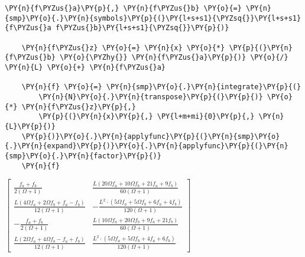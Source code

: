 \begin{tcolorbox}[breakable, size=fbox, boxrule=1pt, pad at break*=1mm,colback=cellbackground, colframe=cellborder]
    \begin{Verbatim}[commandchars=\\\{\}]
    \PY{n}{f\PYZus{}a}\PY{p}{,} \PY{n}{f\PYZus{}b} \PY{o}{=} \PY{n}{smp}\PY{o}{.}\PY{n}{symbols}\PY{p}{(}\PY{l+s+s1}{\PYZsq{}}\PY{l+s+s1}{f\PYZus{}a f\PYZus{}b}\PY{l+s+s1}{\PYZsq{}}\PY{p}{)}
    
    \PY{n}{f\PYZus{}z} \PY{o}{=} \PY{n}{x} \PY{o}{*} \PY{p}{(}\PY{n}{f\PYZus{}b} \PY{o}{\PYZhy{}} \PY{n}{f\PYZus{}a}\PY{p}{)} \PY{o}{/} \PY{n}{L} \PY{o}{+} \PY{n}{f\PYZus{}a}
    
    \PY{n}{f} \PY{o}{=} \PY{n}{smp}\PY{o}{.}\PY{n}{integrate}\PY{p}{(}
        \PY{n}{N}\PY{o}{.}\PY{n}{transpose}\PY{p}{(}\PY{p}{)} \PY{o}{*} \PY{n}{f\PYZus{}z}\PY{p}{,}
        \PY{p}{(}\PY{n}{x}\PY{p}{,} \PY{l+m+mi}{0}\PY{p}{,} \PY{n}{L}\PY{p}{)}
    \PY{p}{)}\PY{o}{.}\PY{n}{applyfunc}\PY{p}{(}\PY{n}{smp}\PY{o}{.}\PY{n}{expand}\PY{p}{)}\PY{o}{.}\PY{n}{applyfunc}\PY{p}{(}\PY{n}{smp}\PY{o}{.}\PY{n}{factor}\PY{p}{)}
    \PY{n}{f}
    \end{Verbatim}
\end{tcolorbox}
     
                
    
    $\displaystyle \left[\begin{matrix}\frac{f_{a} + f_{b}}{2 \left(\Omega + 1\right)} & \frac{L \left(20 \Omega f_{a} + 10 \Omega f_{b} + 21 f_{a} + 9 f_{b}\right)}{60 \left(\Omega + 1\right)}\\\frac{L \left(4 \Omega f_{a} + 2 \Omega f_{b} + f_{a} - f_{b}\right)}{12 \left(\Omega + 1\right)} & - \frac{L^{2} \cdot \left(5 \Omega f_{a} + 5 \Omega f_{b} + 6 f_{a} + 4 f_{b}\right)}{120 \left(\Omega + 1\right)}\\- \frac{f_{a} + f_{b}}{2 \left(\Omega + 1\right)} & \frac{L \left(10 \Omega f_{a} + 20 \Omega f_{b} + 9 f_{a} + 21 f_{b}\right)}{60 \left(\Omega + 1\right)}\\\frac{L \left(2 \Omega f_{a} + 4 \Omega f_{b} - f_{a} + f_{b}\right)}{12 \left(\Omega + 1\right)} & \frac{L^{2} \cdot \left(5 \Omega f_{a} + 5 \Omega f_{b} + 4 f_{a} + 6 f_{b}\right)}{120 \left(\Omega + 1\right)}\end{matrix}\right]$
    